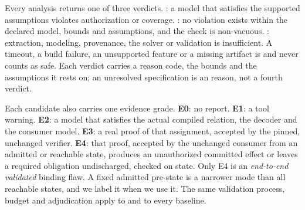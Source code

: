 Every analysis returns one of three verdicts. \VIOL{}: a model that satisfies
the supported assumptions violates authorization or coverage. \VWS{}: no
violation exists within the declared model, bounds and assumptions, and the
check is non-vacuous. \UNK{}: extraction, modeling, provenance, the solver or
validation is insufficient. A timeout, a build failure, an unsupported
feature or a missing artifact is \UNK{} and never counts as safe. Each
verdict carries a reason code, the bounds and the assumptions it rests on;
an unresolved specification is an \UNK{} reason, not a fourth verdict.%

Each candidate also carries one evidence grade. \textbf{E0}: no report.
\textbf{E1}: a tool warning. \textbf{E2}: a model that satisfies the actual
compiled relation, the decoder and the consumer model. \textbf{E3}: a real
proof of that assignment, accepted by the pinned, unchanged verifier.
\textbf{E4}: that proof, accepted by the unchanged consumer from an admitted
or reachable state, produces an unauthorized committed effect or leaves a
required obligation undischarged, checked on state. Only E4 is an
\emph{end-to-end validated} binding flaw. A fixed admitted pre-state is a
narrower mode than all reachable states, and we label it when we use it. The
same validation process, budget and adjudication apply to \tool{} and to every
baseline.%
